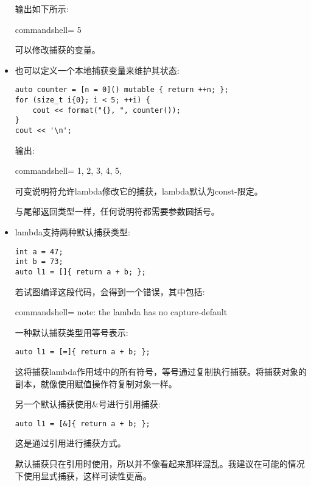 \begin{itemize}
输出如下所示:

\begin{tcblisting}{commandshell={}}
5
\end{tcblisting}

可以修改捕获的变量。


\item 

也可以定义一个本地捕获变量来维护其状态:

\begin{lstlisting}[style=styleCXX]
auto counter = [n = 0]() mutable { return ++n; };
for (size_t i{0}; i < 5; ++i) {
	cout << format("{}, ", counter());
}
cout << '\n';
\end{lstlisting}

输出:

\begin{tcblisting}{commandshell={}}
1, 2, 3, 4, 5,
\end{tcblisting}

可变说明符允许lambda修改它的捕获，lambda默认为const-限定。

与尾部返回类型一样，任何说明符都需要参数圆括号。

\item 
lambda支持两种默认捕获类型:

\begin{lstlisting}[style=styleCXX]
int a = 47;
int b = 73;
auto l1 = []{ return a + b; };
\end{lstlisting}

若试图编译这段代码，会得到一个错误，其中包括:

\begin{tcblisting}{commandshell={}}
note: the lambda has no capture-default
\end{tcblisting}

一种默认捕获类型用等号表示:

\begin{lstlisting}[style=styleCXX]
auto l1 = [=]{ return a + b; };
\end{lstlisting}

这将捕获lambda作用域中的所有符号，等号通过复制执行捕获。将捕获对象的副本，就像使用赋值操作符复制对象一样。

另一个默认捕获使用\&号进行引用捕获:

\begin{lstlisting}[style=styleCXX]
auto l1 = [&]{ return a + b; };
\end{lstlisting}

这是通过引用进行捕获方式。

默认捕获只在引用时使用，所以并不像看起来那样混乱。我建议在可能的情况下使用显式捕获，这样可读性更高。

\end{itemize}


